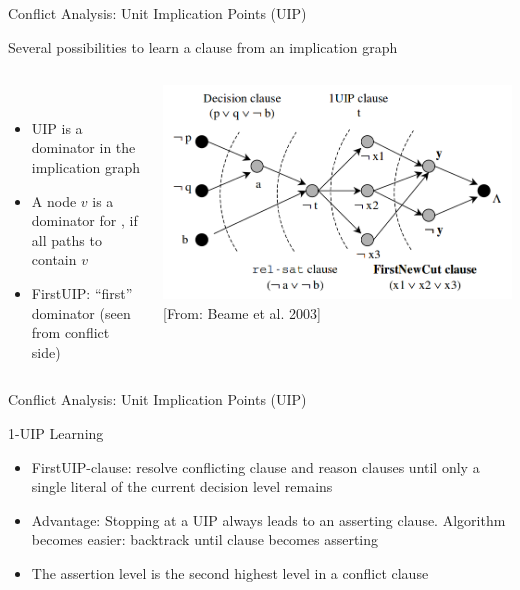 \documentclass[t]{sdqbeamer}
\begin{document}
\begin{frame}{Conflict Analysis: Unit Implication Points (UIP)}
\begin{block}{Several possibilities to learn a clause from an implication graph}
\begin{columns}[T]
\begin{column}{0.5\textwidth}
	~\\[1ex]
	\begin{itemize}\setlength{\itemsep}{1ex}
		\item UIP is a dominator in the implication graph
		\item A node $v$ is a dominator for \blitz, if all paths to \blitz contain $v$
		\item FirstUIP: ``first'' dominator (seen from conflict side)
	\end{itemize}
\end{column}
\begin{column}{0.5\textwidth}
	\includegraphics[width=\linewidth]{figures/l04/implicationgraphcuts.png}
	\hfill*\footnotesize{[From: Beame et al. 2003]}
\end{column}
\end{columns}
\end{block}%
\end{frame}
			
			
\begin{frame}{Conflict Analysis: Unit Implication Points (UIP)}
\begin{block}{1-UIP Learning}
\begin{itemize}\setlength{\itemsep}{1em}
\item FirstUIP-clause: resolve conflicting clause and reason clauses until only a single literal of the current decision level remains 
\item Advantage: Stopping at a UIP always leads to an asserting clause. Algorithm becomes easier: backtrack until clause becomes asserting
\item The assertion level is the second highest level in a conflict clause
\end{itemize}
\end{block}
\end{frame}
\end{document}
